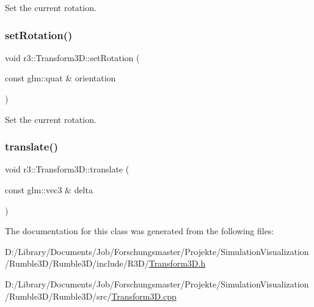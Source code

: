 Set the current rotation. \mbox{\label{classr3_1_1_transform3_d_af539b9a5a73f5196515f9a55ee73be4d}} 
\subsubsection{\texorpdfstring{set\+Rotation()}{setRotation()}\hspace{0.1cm}{\footnotesize\ttfamily [2/2]}}
{\footnotesize\ttfamily void r3\+::\+Transform3\+D\+::set\+Rotation (\begin{DoxyParamCaption}\item[{const glm\+::quat \&}]{orientation }\end{DoxyParamCaption})}

Set the current rotation. \mbox{\label{classr3_1_1_transform3_d_a36ca89f7424b3efec3f2d5532c37f457}} 
\subsubsection{\texorpdfstring{translate()}{translate()}}
{\footnotesize\ttfamily void r3\+::\+Transform3\+D\+::translate (\begin{DoxyParamCaption}\item[{const glm\+::vec3 \&}]{delta }\end{DoxyParamCaption})}



The documentation for this class was generated from the following files\+:\begin{DoxyCompactItemize}
\item 
D\+:/\+Library/\+Documents/\+Job/\+Forschungsmaster/\+Projekte/\+Simulation\+Visualization/\+Rumble3\+D/\+Rumble3\+D/include/\+R3\+D/\mbox{\hyperlink{_transform3_d_8h}{Transform3\+D.\+h}}\item 
D\+:/\+Library/\+Documents/\+Job/\+Forschungsmaster/\+Projekte/\+Simulation\+Visualization/\+Rumble3\+D/\+Rumble3\+D/src/\mbox{\hyperlink{_transform3_d_8cpp}{Transform3\+D.\+cpp}}\end{DoxyCompactItemize}
